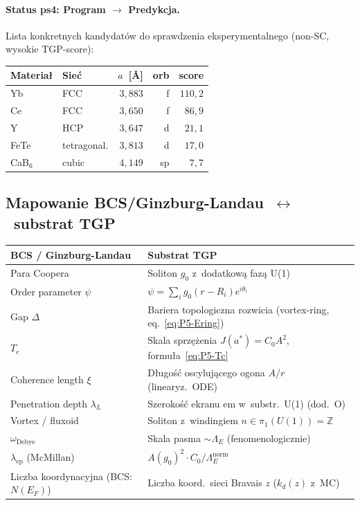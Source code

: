 \paragraph{Status ps4: Program $\to$ Predykcja.}
Lista konkretnych kandydat\'ow do sprawdzenia eksperymentalnego
(non-SC, wysokie TGP-score):
\begin{center}
\begin{tabular}{@{}llrrr@{}}
\toprule
Materia\l{} & Sie\'c & $a$~[\AA] & orb & score \\
\midrule
Yb    & FCC         & $3{,}883$ & f  & $110{,}2$ \\
Ce    & FCC         & $3{,}650$ & f  & $86{,}9$  \\
Y     & HCP         & $3{,}647$ & d  & $21{,}1$  \\
FeTe  & tetragonal.  & $3{,}813$ & d  & $17{,}0$  \\
CaB$_6$ & cubic     & $4{,}149$ & sp & $7{,}7$   \\
\bottomrule
\end{tabular}
\end{center}

\subsection{Mapowanie BCS/Ginzburg-Landau~$\leftrightarrow$~substrat TGP}%
\label{app:P5-mapping}

\begin{center}\small
\begin{tabular}{@{}ll@{}}
\toprule
\textbf{BCS / Ginzburg-Landau} & \textbf{Substrat TGP} \\
\midrule
Para Coopera                        & Soliton $g_0$ z~dodatkow\k{a} faz\k{a} U(1) \\
Order parameter $\psi$              & $\psi = \sum_i g_0(r-R_i) e^{i\theta_i}$ \\
Gap $\Delta$                        & Bariera topologiczna rozwicia (vortex-ring, eq.~\eqref{eq:P5-Ering}) \\
$T_c$                                & Skala sprz\k{e}\.zenia $J(a^*) = C_0 A^2$, formu\l{}a~\eqref{eq:P5-Tc} \\
Coherence length $\xi$              & D\l{}ugo\'s\'c oscyluj\k{a}cego ogona $A/r$ (linearyz.~ODE) \\
Penetration depth $\lambda_L$       & Szeroko\'s\'c ekranu em w~substr.~U(1) (dod.~O) \\
Vortex / fluxoid                     & Soliton z~windingiem $n \in \pi_1(U(1)) = \mathbb{Z}$ \\
$\omega_\text{Debye}$                & Skala pasma $\sim \Lambda_E$ (fenomenologicznie) \\
$\lambda_\text{ep}$ (McMillan)      & $A(g_0)^2 \cdot C_0 / \Lambda_E^\text{norm}$ \\
Liczba koordynacyjna (BCS: $N(E_F)$) & Liczba koord.~sieci Bravais $z$ ($k_d(z)$ z~MC) \\
\bottomrule
\end{tabular}
\end{center}

